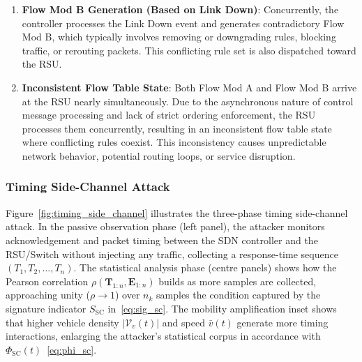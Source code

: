 \begin{enumerate}
    \item \textbf{Flow Mod B Generation (Based on Link Down)}: Concurrently, the controller processes the Link Down event and generates contradictory Flow Mod B, which typically involves removing or downgrading rules, blocking traffic, or rerouting packets. This conflicting rule set is also dispatched toward the RSU.
    
    \item \textbf{Inconsistent Flow Table State}: Both Flow Mod A and Flow Mod B arrive at the RSU nearly simultaneously. Due to the asynchronous nature of control message processing and lack of strict ordering enforcement, the RSU processes them concurrently, resulting in an inconsistent flow table state where conflicting rules coexist. This inconsistency causes unpredictable network behavior, potential routing loops, or service disruption.
\end{enumerate}

\subsubsection{Timing Side-Channel Attack}



Figure~\ref{fig:timing_side_channel} illustrates the
three-phase timing side-channel attack. In the passive
observation phase (left panel), the attacker monitors
acknowledgement and packet timing between the SDN controller
and the RSU/Switch without injecting any traffic, collecting
a response-time sequence
$(T_1, T_2, \ldots, T_n)$. The statistical analysis phase
(centre panels) shows how the Pearson correlation
$\rho(\mathbf{T}_{1:n}, \mathbf{E}_{1:n})$ builds as more
samples are collected, approaching unity ($\rho \to 1$) over
$n_k$ samples  the condition captured by the signature
indicator $S_{\mathrm{SC}}$ in~\eqref{eq:sig_sc}. The
mobility amplification inset shows that higher vehicle density
$|\mathcal{V}_v(t)|$ and speed $\bar{v}(t)$ generate more
timing interactions, enlarging the attacker's statistical
corpus in accordance with
$\Phi_{\mathrm{SC}}(t)$~\eqref{eq:phi_sc}.

